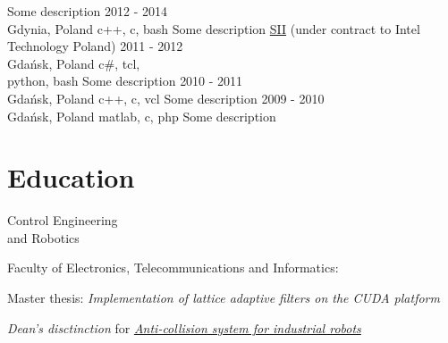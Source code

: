 \documentclass[a4paper,11pt]{cv4tw}%
\begin{document}
      {Some description}
      {2012 - 2014\\Gdynia, Poland}
      {c++, c, bash}
      {Some description}
      {\href{https://sii.pl/en/}{SII} (under contract to Intel Technology Poland)}
      {2011 - 2012\\Gdańsk, Poland}
      {c\#, tcl,\\python, bash}
      {Some description}
      {2010 - 2011\\Gdańsk, Poland}
      {c++, c, vcl}
      {Some description}
      {2009 - 2010\\Gdańsk, Poland}
      {matlab, c, php}
      {Some description}
\section{Education}
      {Control Engineering\\and Robotics}
      {Faculty of Electronics, Telecommunications and Informatics:
        \begin{missions}
          \item Master thesis: \textit{Implementation of lattice adaptive filters on the CUDA platform}
          \item \emph{Dean's disctinction} for
            \href{https://projektgrupowy.eti.pg.gda.pl/editions/2/projects/496/posters/138}
                 {\itshape Anti-collision system for industrial robots}
        \end{missions}
      }
\end{document}
